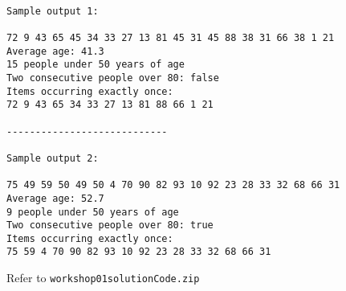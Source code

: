 \begin{questions}
\begin{verbatim}

Sample output 1:

72 9 43 65 45 34 33 27 13 81 45 31 45 88 38 31 66 38 1 21 
Average age: 41.3
15 people under 50 years of age
Two consecutive people over 80: false
Items occurring exactly once:
72 9 43 65 34 33 27 13 81 88 66 1 21 

----------------------------

Sample output 2:

75 49 59 50 49 50 4 70 90 82 93 10 92 23 28 33 32 68 66 31 
Average age: 52.7
9 people under 50 years of age
Two consecutive people over 80: true
Items occurring exactly once:
75 59 4 70 90 82 93 10 92 23 28 33 32 68 66 31 

\end{verbatim}

\begin{solution}
Refer to \texttt{workshop01solutionCode.zip}	
\end{solution}
\end{questions}


